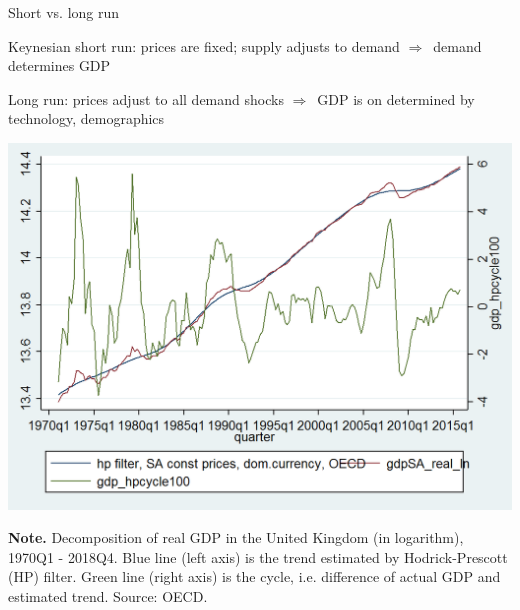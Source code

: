 \documentclass{beamer}
\newcommand{\tb}[1]{{\color{blue}{\textbf{#1}}}}
\newenvironment{mytemize}
{\vfill\itemize[nolistsep,itemsep=\fill,label=\color{blue}{$\triangleright$}]}
  {\enditemize}
\newcommand{\rarr}{$\Rightarrow$\ }
\begin{document}
\begin{frame}{Short vs. long run}

\begin{mytemize}
\item Keynesian short run: prices are fixed; supply adjusts to demand \rarr demand determines GDP
\item Long run: prices adjust to all demand shocks \rarr GDP is on \tb{trend} determined by technology, demographics 
\end{mytemize}
  \begin{center}
\includegraphics[trim=0 140 0 0,clip,width=0.75\columnwidth]{FIGURES/8_UKoutputDecomp}
\vspace{0.5mm}
\begin{minipage}{1.0\columnwidth}
\small	
\textbf{Note.} Decomposition of real GDP in the United Kingdom (in logarithm), 1970Q1 - 2018Q4. Blue line (left axis) is the trend estimated by Hodrick-Prescott (HP) filter. Green line (right axis) is the cycle, i.e. difference of actual GDP and estimated trend. Source: OECD.
\end{minipage}
  \end{center}

\end{frame}
\end{document}
